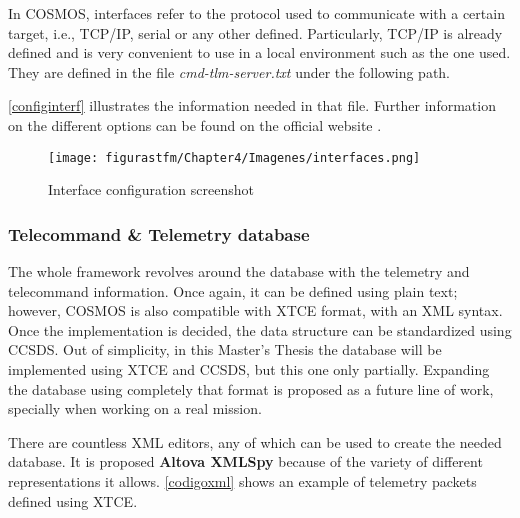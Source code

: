 In COSMOS, interfaces refer to the protocol used to communicate with a certain target, i.e., TCP/IP, serial or any other defined. Particularly, TCP/IP is already defined and is very convenient to use in a local environment such as the one used. They are defined in the file \textit{cmd-tlm-server.txt} under the following path.


	\begin{figure} [H]
\centering
\begin{minipage}{5cm}
\end{minipage}
\end{figure}

\autoref{configinterf} illustrates the information needed in that file. Further information on the different options can be found on the official website \cite{cosmos}.

\begin{figure} [H]
			\centering
			\texttt{[image: figurastfm/Chapter4/Imagenes/interfaces.png]}
			\caption{Interface configuration screenshot} \label{configinterf}
\end{figure}

\subsubsection{Telecommand \& Telemetry database}

The whole framework revolves around the database with the telemetry and telecommand information. Once again, it can be defined using plain text; however, COSMOS is also compatible with \acrshort{XTCE} format, with an XML syntax. Once the implementation is decided, the data structure can be standardized using \acrshort{CCSDS}. Out of simplicity, in this Master's Thesis the database will be implemented using \acrshort{XTCE} and \acrshort{CCSDS}, but this one only partially. Expanding the database using completely that format is proposed as a future line of work, specially when working on a real mission.

There are countless XML editors, any of which can be used to create the needed database. It is proposed \textbf{Altova XMLSpy} because of the variety of different representations it allows. \autoref{codigoxml} shows an example of telemetry packets defined using \acrshort{XTCE}.

